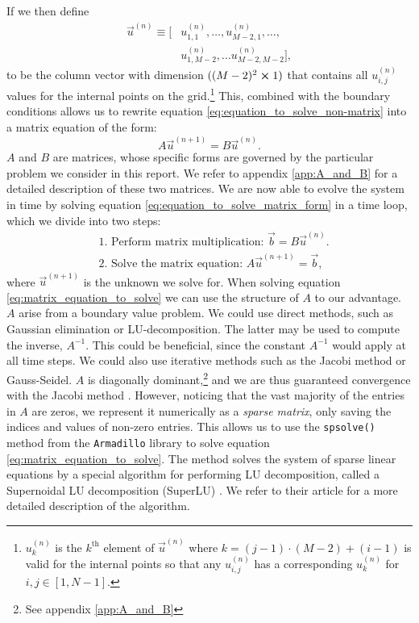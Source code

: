         If we then define 
        \begin{equation}
            \begin{split}
                \vec{u}^{(n)} \equiv [&u_{1,1}^{(n)}, \dots, u_{M-2,1}^{(n)}, \dots, \\ 
                &u_{1,M-2}^{(n)}, \dots u_{M-2, M-2}^{(n)}],
            \end{split}
        \end{equation}
        to be the column vector with dimension $((M-2)^2 \cross 1)$ that contains all $u_{i,j}^{(n)}$ values for the internal points on the grid.\footnote{$u_k^{(n)}$ is the $k^\mathrm{th}$ element of $\vec{u}^{(n)}$ where $k=(j-1)\cdot(M-2) + (i-1)$ is valid for the internal points so that any $u_{i,j}^{(n)}$ has a corresponding $u_k^{(n)}$ for $i,j\in[1,N-1]$.} This, combined with the boundary conditions allows us to rewrite equation \eqref{eq:equation_to_solve_non-matrix} into a matrix equation of the form:
        \begin{equation}\label{eq:equation_to_solve_matrix_form}
            A\vec{u}^{(n+1)} = B\vec{u}^{(n)}.
        \end{equation}
        $A$ and $B$ are matrices, whose specific forms are governed by the particular problem we consider in this report. We refer to appendix \ref{app:A_and_B} for a detailed description of these two matrices.
        We are now able to evolve the system in time by solving equation \eqref{eq:equation_to_solve_matrix_form} in a time loop, which we divide into two steps:
        \begin{equation}\label{eq:matrix_equation_to_solve}
            \begin{split}
                &\text{1. Perform matrix multiplication: } \vec{b} = B\vec{u}^{(n)}. \\
                &\text{2. Solve the matrix equation: } A\vec{u}^{(n+1)} = \vec{b},
            \end{split}
        \end{equation}
        where $\vec{u}^{(n+1)}$ is the unknown we solve for. When solving equation \eqref{eq:matrix_equation_to_solve} we can use the structure of $A$ to our advantage. $A$ arise from a boundary value problem. We could use direct methods, such as Gaussian elimination or LU-decomposition. The latter may be used to compute the inverse, $A^{-1}$. This could be beneficial, since the constant $A^{-1}$ would apply at all time steps. We could also use iterative methods such as the Jacobi method or Gauss-Seidel. $A$ is diagonally dominant,\footnote{See appendix \ref{app:A_and_B}} and we are thus guaranteed convergence with the Jacobi method \citep{lecture_notes}. However, noticing that the vast majority of the entries in $A$ are zeros, we represent it numerically as a \textit{sparse matrix}, only saving the indices and values of non-zero entries. This allows us to use the \texttt{spsolve()} method from the \texttt{Armadillo} library to solve equation \eqref{eq:matrix_equation_to_solve}. The method solves the system of sparse linear equations by a special algorithm for performing LU decomposition, called a Supernoidal LU decomposition (SuperLU) \cite{SuperLU}. We refer to their article for a more detailed description of the algorithm.
        
